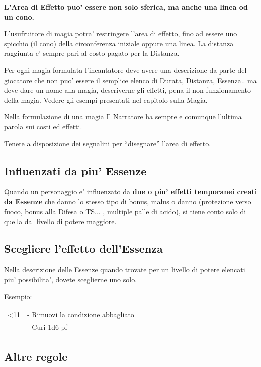 \documentclass[a4paper,11pt,twoside,openany]{dndbook}
\begin{document}
\label{aree-di-effetto-diverse}

\textbf{L'Area di Effetto puo' essere non solo sferica, ma anche una linea od un cono.}

L'usufruitore di magia potra' restringere l'area di effetto, fino ad essere uno spicchio (il cono) della circonferenza iniziale oppure una linea. La distanza raggiunta e' sempre pari al costo pagato per la Distanza.

Per ogni magia formulata l'incantatore deve avere una descrizione da parte del giocatore che non puo' essere il semplice elenco di Durata, Distanza, Essenza.. ma deve dare un nome alla magia, descriverne gli effetti, pena il non funzionamento della magia. Vedere gli esempi presentati nel capitolo sulla Magia.

Nella formulazione di una magia Il Narratore ha sempre e comunque l'ultima parola sui costi ed effetti.

Tenete a disposizione dei segnalini per ``disegnare'' l'area di effetto.

\subsection{Influenzati da piu' Essenze}

\label{influenzati-da-piu-essenze}

Quando un personaggio e' influenzato da \textbf{due o piu' effetti temporanei creati da Essenze} che danno lo stesso tipo di bonus, malus o danno (protezione verso fuoco, bonus alla Difesa o TS... , multiple palle di acido), si tiene conto solo di quella dal livello di potere maggiore.

\subsection{Scegliere l'effetto dell'Essenza}

\label{scegliere-leffetto-dellessenza}

Nella descrizione delle Essenze quando trovate per un livello di potere elencati piu' possibilita', dovete sceglierne uno solo.

Esempio:

\begin{tabular}[c]{@{}ll@{}}
\toprule 
<11 & - Rimuovi la condizione abbagliato\tabularnewline
& - Curi 1d6 pf
\end{tabular}

\subsection{Altre regole}
\end{document}
